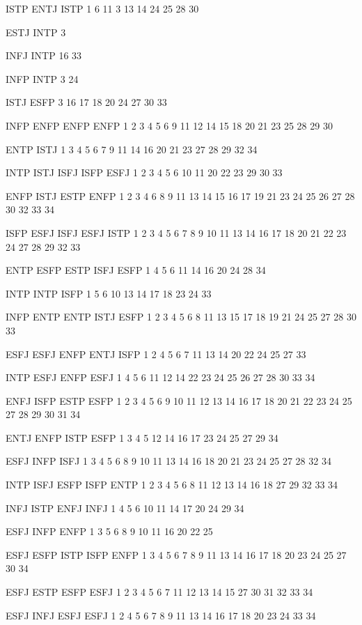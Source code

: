ISTP	ENTJ	ISTP	1	6	11	3	13	14	24	25	28	30																		

ESTJ	INTP	3																												

INFJ	INTP	16	33																											

INFP	INTP	3	24																											

ISTJ	ESFP	3	16	17	18	20	24	27	30	33																				

INFP	ENFP	ENFP	ENFP	1	2	3	4	5	6	9	11	12	14	15	18	20	21	23	25	28	29	30								

ENTP	ISTJ	1	3	4	5	6	7	9	11	14	16	20	21	23	27	28	29	32	34											

INTP	ISTJ	ISFJ	ISFP	ESFJ	1	2	3	4	5	6	10	11	20	22	23	29	30	33												

ENFP	ISTJ	ESTP	ENFP	1	2	3	4	6	8	9	11	13	14	15	16	17	19	21	23	24	25	26	27	28	30	32	33	34		

ISFP	ESFJ	ISFJ	ESFJ	ISTP	1	2	3	4	5	6	7	8	9	10	11	13	14	16	17	18	20	21	22	23	24	27	28	29	32	33

ENTP	ESFP	ESTP	ISFJ	ESFP	1	4	5	6	11	14	16	20	24	28	34															

INTP	INTP	ISFP	1	5	6	10	13	14	17	18	23	24	33																	

INFP	ENTP	ENTP	ISTJ	ESFP	1	2	3	4	5	6	8	11	13	15	17	18	19	21	24	25	27	28	30	33						

ESFJ	ESFJ	ENFP	ENTJ	ISFP	1	2	4	5	6	7	11	13	14	20	22	24	25	27	33											

INTP	ESFJ	ENFP	ESFJ	1	4	5	6	11	12	14	22	23	24	25	26	27	28	30	33	34										

ENFJ	ISFP	ESTP	ESFP	1	2	3	4	5	6	9	10	11	12	13	14	16	17	18	20	21	22	23	24	25	27	28	29	30	31	34

ENTJ	ENFP	ISTP	ESFP	1	3	4	5	12	14	16	17	23	24	25	27	29	34													

ESFJ	INFP	ISFJ	1	3	4	5	6	8	9	10	11	13	14	16	18	20	21	23	24	25	27	28	32	34						

INTP	ISFJ	ESFP	ISFP	ENTP	1	2	3	4	5	6	8	11	12	13	14	16	18	27	29	32	33	34								

INFJ	ISTP	ENFJ	INFJ	1	4	5	6	10	11	14	17	20	24	29	34															

ESFJ	INFP	ENFP	1	3	5	6	8	9	10	11	16	20	22	25																

ESFJ	ESFP	ISTP	ISFP	ENFP	1	3	4	5	6	7	8	9	11	13	14	16	17	18	20	23	24	25	27	30	34					

ESFJ	ESTP	ESFP	ESFJ	1	2	3	4	5	6	7	11	12	13	14	15	27	30	31	32	33	34									

ESFJ	INFJ	ESFJ	ESFJ	1	2	4	5	6	7	8	9	11	13	14	16	17	18	20	23	24	33	34								


